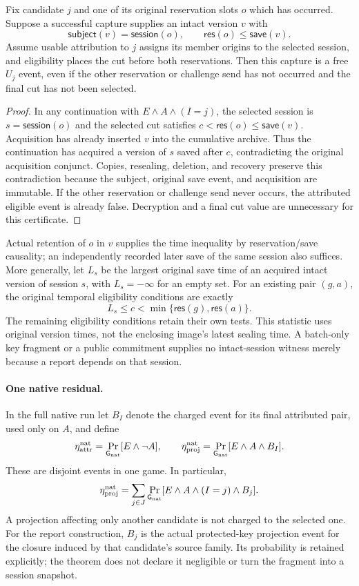 \begin{lemma}
\label{lem:adaptive-origin-stop}
Fix candidate $j$ and one of its original reservation slots $o$ which has
occurred.  Suppose a successful capture supplies an intact version $v$ with
\[
 \mathsf{subject}(v)=\mathsf{session}(o),\qquad
 \mathsf{res}(o)\le\mathsf{save}(v).
\]
Assume usable attribution to $j$ assigns its member origins to the selected
session, and eligibility places the cut before both reservations.  Then this
capture is a free $U_j$ event, even if the other reservation or challenge send
has not occurred and the final cut has not been selected.
\end{lemma}
\begin{proof}
In any continuation with $E\land A\land(I=j)$, the selected session is
$s=\mathsf{session}(o)$ and the selected cut satisfies
$c<\mathsf{res}(o)\le\mathsf{save}(v)$.  Acquisition has already inserted
$v$ into the cumulative archive.  Thus the continuation has acquired a version
of $s$ saved after $c$, contradicting the original acquisition conjunct.
Copies, resealing, deletion, and recovery preserve this contradiction because
the subject, original save event, and acquisition are immutable.  If the other
reservation or challenge send never occurs, the attributed eligible event is
already false.  Decryption and a final cut value are unnecessary for this
certificate.
\end{proof}

Actual retention of $o$ in $v$ supplies the time inequality by reservation/save
causality; an independently recorded later save of the same session also
suffices.  More generally, let $L_s$ be the largest original save time of an
acquired intact version of session $s$, with $L_s=-\infty$ for an empty set.
For an existing pair $(g,a)$, the original temporal eligibility conditions are
exactly
\[
       L_s\le c<\min\{\mathsf{res}(g),\mathsf{res}(a)\}.
\]
The remaining eligibility conditions retain their own tests.  This statistic
uses original version times, not the enclosing image's latest sealing time.
A batch-only key fragment or a public commitment supplies no intact-session
witness merely because a report depends on that session.

\paragraph{One native residual.}
In the full native run let $B_I$ denote the charged event for its final
attributed pair, used only on $A$, and define
\[
 \eta_{\rm attr}^{\rm nat}=\Pr_{\mathsf G_{\rm nat}}[E\land\neg A],
 \qquad
 \eta_{\rm proj}^{\rm nat}=\Pr_{\mathsf G_{\rm nat}}[E\land A\land B_I].
\]
These are disjoint events in one game.  In particular,
\[
 \eta_{\rm proj}^{\rm nat}
 =\sum_{j\in J}\Pr_{\mathsf G_{\rm nat}}
       [E\land A\land(I=j)\land B_j].
\]
A projection affecting only another candidate is not charged to the selected
one.  For the report construction, $B_j$ is the actual protected-key
projection event for the closure induced by that candidate's source family.
Its probability is retained explicitly; the theorem does not declare it
negligible or turn the fragment into a session snapshot.

